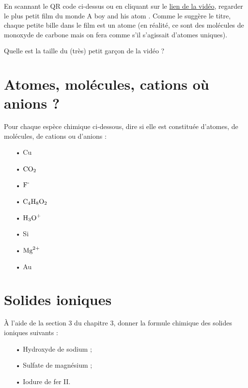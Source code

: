 \documentclass[12pt,a4paper]{article}
\begin{document}
En scannant le QR code ci-dessus ou en cliquant sur le \href{https://youtu.be/oSCX78-8-q0?t=28}{lien de la vidéo}, regarder le plus petit film du monde \og A boy and his atom \fg{}.
Comme le suggère le titre, chaque petite \og bille \fg{} dans le film est un atome (en réalité, ce sont des molécules de monoxyde de carbone mais on fera comme s'il s'agissait d'atomes uniques).

Quelle est la taille du (très) petit garçon de la vidéo ?

\section*{Atomes, molécules, cations où anions ?}

Pour chaque espèce chimique ci-dessous, dire si elle est constituée d'atomes, de molécules, de
cations ou d'anions :
\begin{multicols}{4}
\begin{itemize}
\item[•] Cu
\item[•] $\text{CO}_\text{2}$
\item[•] $\text{F}^\text{-}$
\item[•] $\text{C}_4\text{H}_8\text{O}_2$
\item[•] $\text{H}_3\text{O}^\text{+}$
\item[•] Si
\item[•] $\text{Mg}^\text{2+}$
\item[•] Au
\end{itemize}
\end{multicols}

\section*{Solides ioniques}

À l'aide de la section 3 du chapitre 3, donner la formule chimique des solides ioniques suivants :
\begin{multicols}{3}
\begin{itemize}
\item[•] Hydroxyde de sodium ;
\item[•] Sulfate de magnésium ;
\item[•] Iodure de fer II.
\end{itemize}
\end{multicols}


  
\end{document}
